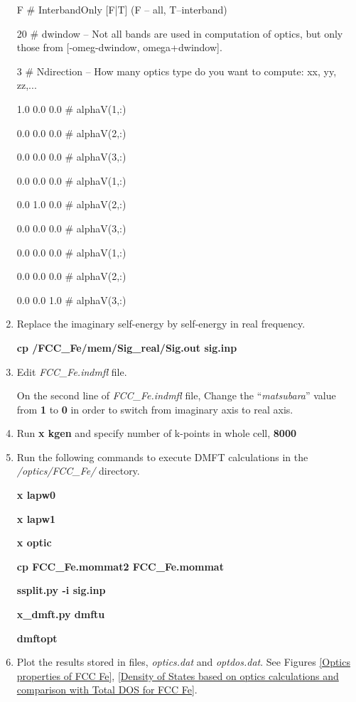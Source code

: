 \documentclass[12 pt]{article}
\begin{document}
\begin{enumerate}
{    F          \# InterbandOnly [F|T] (F -- all, T--interband)

    20         \# dwindow -- Not all bands are used in computation of optics, but only those from [-omeg-dwindow, 
omega+dwindow].

    3          \# Ndirection -- How many optics type do you want to compute: xx, yy, zz,...

    1.0 0.0 0.0    \# alphaV(1,:)

    0.0 0.0 0.0    \# alphaV(2,:)

    0.0 0.0 0.0    \# alphaV(3,:)

    0.0 0.0 0.0    \# alphaV(1,:)

    0.0 1.0 0.0    \# alphaV(2,:)

    0.0 0.0 0.0    \# alphaV(3,:)

    0.0 0.0 0.0    \# alphaV(1,:)

    0.0 0.0 0.0    \# alphaV(2,:)

    0.0 0.0 1.0    \# alphaV(3,:)
}

    \item Replace the imaginary self-energy by self-energy in real frequency. 

  \textbf{cp /FCC\_Fe/mem/Sig\_real/Sig.out sig.inp}

    \item Edit \emph{FCC\_Fe.indmfl} file. 

  On the second line of \emph{FCC\_Fe.indmfl} file, Change the ``\emph{matsubara}'' value from \textbf{1} to 
\textbf{0} in order to switch from imaginary axis to real axis.

    \item Run \textbf{x kgen} and specify number of k-points in whole cell, \textbf{8000}

    \item Run the following commands to execute DMFT calculations in the \emph{/optics/FCC\_Fe/} directory.

  \textbf{x lapw0}

  \textbf{x lapw1}

  \textbf{x optic}

  \textbf{cp FCC\_Fe.mommat2 FCC\_Fe.mommat}

  \textbf{ssplit.py -i sig.inp}

  \textbf{x\_dmft.py dmftu}

  \textbf{dmftopt}

    \item Plot the results stored in files, \emph{optics.dat} and \emph{optdos.dat}. See Figures 
\ref{Optics properties of FCC Fe}, \ref{Density of States based on optics calculations and comparison with Total DOS 
for FCC Fe}.


\end{enumerate}
\end{document}
